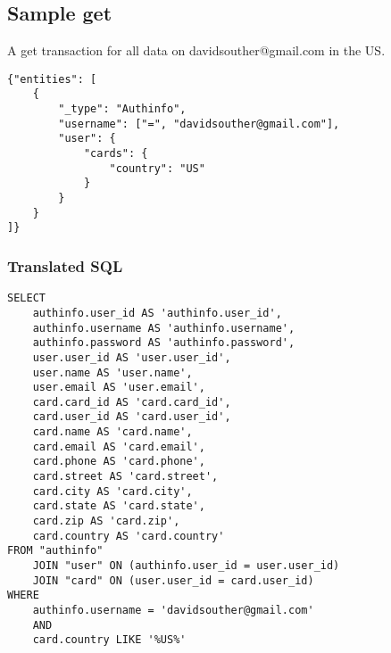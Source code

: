 \documentclass{article}
\renewcommand{\|}{\textbar}
\begin{document}
\subsection{Sample {\ilcode get}}
A {\ilcode get} transaction for all data on davidsouther@gmail.com in the US.
\linespread{1}
\begin{lstlisting}
{"entities": [
	{
		"_type": "Authinfo",
		"username": ["=", "davidsouther@gmail.com"],
		"user": {
			"cards": {
				"country": "US"
			}
		}
	}
]}
\end{lstlisting}
\subsubsection{Translated SQL}

\lstset{language=SQL}
\begin{lstlisting}
SELECT
	authinfo.user_id AS 'authinfo.user_id',
	authinfo.username AS 'authinfo.username',
	authinfo.password AS 'authinfo.password',
	user.user_id AS 'user.user_id',
	user.name AS 'user.name',
	user.email AS 'user.email',
	card.card_id AS 'card.card_id',
	card.user_id AS 'card.user_id',
	card.name AS 'card.name',
	card.email AS 'card.email',
	card.phone AS 'card.phone',
	card.street AS 'card.street',
	card.city AS 'card.city',
	card.state AS 'card.state',
	card.zip AS 'card.zip',
	card.country AS 'card.country'
FROM "authinfo"
	JOIN "user" ON (authinfo.user_id = user.user_id)
	JOIN "card" ON (user.user_id = card.user_id)
WHERE
	authinfo.username = 'davidsouther@gmail.com'
	AND
	card.country LIKE '%US%'
\end{lstlisting}
\end{document}
